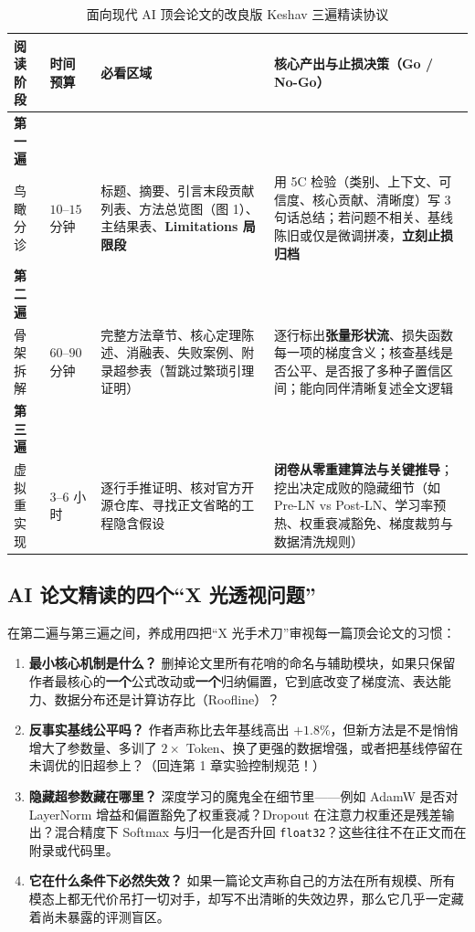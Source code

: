 \begin{table}[htbp]
  \centering
  \caption{面向现代 AI 顶会论文的改良版 Keshav 三遍精读协议}
  \label{tab:three-pass}
  \footnotesize
  \begin{tabularx}{\linewidth}{@{}p{22mm}p{20mm}p{46mm}X@{}}
    \toprule
    \textbf{阅读阶段} & \textbf{时间预算} & \textbf{必看区域} & \textbf{核心产出与止损决策（Go / No-Go）} \\
    \midrule
    \textbf{第一遍}\\鸟瞰分诊 & $10\text{--}15$ 分钟 & 标题、摘要、引言末段贡献列表、方法总览图（图 1）、主结果表、\textbf{Limitations 局限段} & 用 5C 检验（类别、上下文、可信度、核心贡献、清晰度）写 3 句话总结；若问题不相关、基线陈旧或仅是微调拼凑，\textbf{立刻止损归档} \\
    \textbf{第二遍}\\骨架拆解 & $60\text{--}90$ 分钟 & 完整方法章节、核心定理陈述、消融表、失败案例、附录超参表（暂跳过繁琐引理证明） & 逐行标出\textbf{张量形状流}、损失函数每一项的梯度含义；核查基线是否公平、是否报了多种子置信区间；能向同伴清晰复述全文逻辑 \\
    \textbf{第三遍}\\虚拟重实现 & $3\text{--}6$ 小时 & 逐行手推证明、核对官方开源仓库、寻找正文省略的工程隐含假设 & \textbf{闭卷从零重建算法与关键推导}；挖出决定成败的隐藏细节（如 Pre-LN vs Post-LN、学习率预热、权重衰减豁免、梯度裁剪与数据清洗规则） \\
    \bottomrule
  \end{tabularx}
\end{table}

\subsection{AI 论文精读的四个“X 光透视问题”}

在第二遍与第三遍之间，养成用四把“X 光手术刀”审视每一篇顶会论文的习惯：
\begin{enumerate}
  \item \textbf{最小核心机制是什么？} 删掉论文里所有花哨的命名与辅助模块，如果只保留作者最核心的\textbf{一个}公式改动或\textbf{一个}归纳偏置，它到底改变了梯度流、表达能力、数据分布还是计算访存比（Roofline）？
  \item \textbf{反事实基线公平吗？} 作者声称比去年基线高出 $+1.8\%$，但新方法是不是悄悄增大了参数量、多训了 $2\times$ Token、换了更强的数据增强，或者把基线停留在未调优的旧超参上？（回连第 1 章实验控制规范！）
  \item \textbf{隐藏超参数藏在哪里？} 深度学习的魔鬼全在细节里——例如 AdamW 是否对 LayerNorm 增益和偏置豁免了权重衰减？Dropout 在注意力权重还是残差输出？混合精度下 Softmax 与归一化是否升回 \texttt{float32}？这些往往不在正文而在附录或代码里。
  \item \textbf{它在什么条件下必然失效？} 如果一篇论文声称自己的方法在所有规模、所有模态上都无代价吊打一切对手，却写不出清晰的失效边界，那么它几乎一定藏着尚未暴露的评测盲区。
\end{enumerate}

